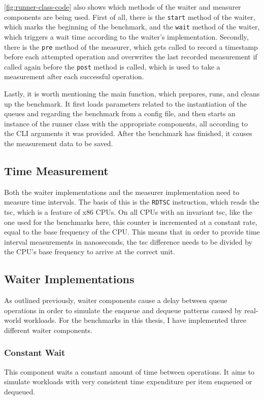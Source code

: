 \autoref{fig:runner-class-code} also shows which methods of the waiter and measurer components are being used.
First of all, there is the \texttt{start} method of the waiter, which marks the beginning of the benchmark,
and the \texttt{wait} method of the waiter, which triggers a wait time according to the waiter's implementation.
Secondly, there is the \texttt{pre} method of the measurer, which gets called to record a timestamp before each
attempted operation and overwrites the last recorded measurement if called again before the \texttt{post}
method is called, which is used to take a measurement after each successful operation.

Lastly, it is worth mentioning the main function, which prepares, runs, and cleans up the benchmark.
It first loads parameters related to the instantiation of the queues and regarding the benchmark from a config file,
and then starts an instance of the runner class with the appropriate components, all according to the CLI
arguments it was provided.
After the benchmark has finished, it causes the measurement data to be saved.

\subsection{Time Measurement}
Both the waiter implementations and the measurer implementation need to measure time intervals.
The basis of this is the \texttt{RDTSC} instruction, which reads the \acrfull{tsc}, which is a
feature of x86 CPUs.
On all CPUs with an invariant \acrshort{tsc}, like the one used for the benchmarks here, this counter is incremented at
a constant rate, equal to the base frequency of the CPU.
This means that in order to provide time interval measurements in nanoseconds, the \acrshort{tsc} difference needs to be
divided by the CPU's base frequency to arrive at the correct unit.

\subsection{Waiter Implementations}
\label{sec:waiter-implementations}
As outlined previously, waiter components cause a delay between queue operations in order to simulate the
enqueue and dequeue patterns caused by real-world workloads.
For the benchmarks in this thesis, I have implemented three different waiter components.

\subsubsection*{Constant Wait}
This component waits a constant amount of time between operations.
It aims to simulate workloads with very consistent time expenditure per item enqueued or dequeued.

